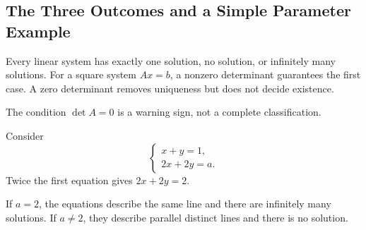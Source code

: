 \subsection{The Three Outcomes and a Simple Parameter Example}

Every linear system has exactly one solution, no solution, or infinitely many solutions. For a square system $Ax=b$, a nonzero determinant guarantees the first case. A zero determinant removes uniqueness but does not decide existence.

\begin{remarkbox}
The condition $\det A=0$ is a warning sign, not a complete classification.
\end{remarkbox}

Consider
\[
\begin{cases}
x+y=1,\\
2x+2y=a.
\end{cases}
\]
Twice the first equation gives $2x+2y=2$.

\begin{summarybox}[Classification]
If $a=2$, the equations describe the same line and there are infinitely many solutions. If $a\neq2$, they describe parallel distinct lines and there is no solution.
\end{summarybox}
